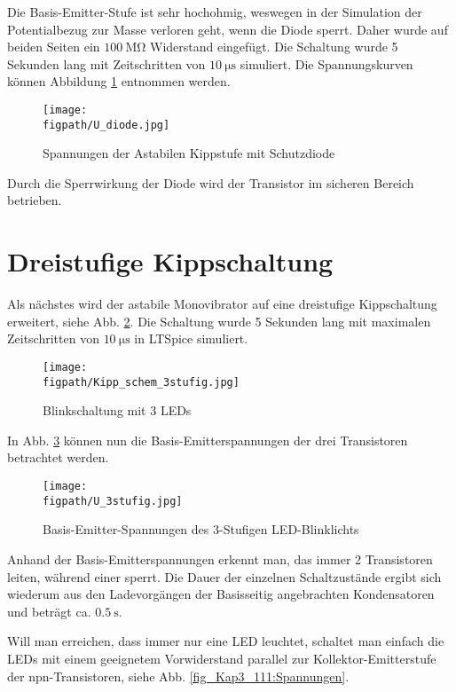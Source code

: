 Die Basis-Emitter-Stufe ist sehr hochohmig, weswegen in der Simulation der Potentialbezug zur Masse verloren geht, wenn die Diode sperrt. Daher wurde auf beiden Seiten ein $\SI{100}{\mega\ohm}$ Widerstand eingefügt. Die Schaltung wurde 5 Sekunden lang mit Zeitschritten von $\SI{10}{\micro\second}$ simuliert. Die Spannungskurven können Abbildung \ref{fig_Kap3_09:Spannungen} entnommen werden.

\begin{figure}[H]
	\centering \small
	\texttt{[image: \\figpath/U\_diode.jpg]}
	\caption{Spannungen der Astabilen Kippstufe mit Schutzdiode}
	\label{fig_Kap3_09:Spannungen}
\end{figure}

Durch die Sperrwirkung der Diode wird der Transistor im sicheren Bereich betrieben.

\section{Dreistufige Kippschaltung}
Als nächstes wird der astabile Monovibrator auf eine dreistufige Kippschaltung erweitert, siehe Abb. \ref{fig_Kap3_10:3stufig}. Die Schaltung wurde 5 Sekunden lang mit maximalen Zeitschritten von $\SI{10}{\micro\second}$ in LTSpice simuliert.

\begin{figure}[H]
    \centering
    \texttt{[image: \\figpath/Kipp\_schem\_3stufig.jpg]}
    \caption{Blinkschaltung mit 3 LEDs}
    \label{fig_Kap3_10:3stufig}
\end{figure}

In Abb. \ref{fig_Kap3_11:Spannungen} können nun die Basis-Emitterspannungen der drei Transistoren betrachtet werden.

\begin{figure}[H]
	\centering \small
	\texttt{[image: \\figpath/U\_3stufig.jpg]}
	\caption{Basis-Emitter-Spannungen des 3-Stufigen LED-Blinklichts}
	\label{fig_Kap3_11:Spannungen}
\end{figure}

Anhand der Basis-Emitterspannungen erkennt man, das immer 2 Transistoren leiten, während einer sperrt. Die Dauer der einzelnen Schaltzustände ergibt sich wiederum aus den Ladevorgängen der Basisseitig angebrachten Kondensatoren und beträgt ca. $\SI{0,5}{\second}$. 

Will man erreichen, dass immer nur eine LED leuchtet, schaltet man einfach die LEDs mit einem geeignetem Vorwiderstand parallel zur Kollektor-Emitterstufe der npn-Transistoren, siehe Abb. \ref{fig_Kap3_111:Spannungen}.

